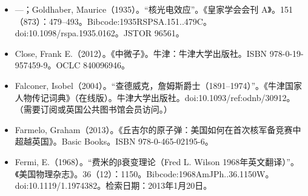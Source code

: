 \begin{itemize}
\item —；Goldhaber, Maurice（1935）。“核光电效应”。《皇家学会会刊 A》。151（873）：479–493。Bibcode:1935RSPSA.151..479C。doi:10.1098/rspa.1935.0162。JSTOR 96561。
\item Close, Frank E.（2012）。《中微子》。牛津：牛津大学出版社。ISBN 978-0-19-957459-9。OCLC 840096946。
\item Falconer, Isobel（2004）。“查德威克，詹姆斯爵士（1891–1974）”。《牛津国家人物传记词典》（在线版）。牛津大学出版社。doi:10.1093/ref:odnb/30912。（需要订阅或英国公共图书馆会员访问。）
\item Farmelo, Graham（2013）。《丘吉尔的原子弹：美国如何在首次核军备竞赛中超越英国》。Basic Books。ISBN 978-0-465-02195-6。
\item Fermi, E.（1968）。“费米的β衰变理论（Fred L. Wilson 1968年英文翻译）”。《美国物理杂志》。36（12）：1150。Bibcode:1968AmJPh..36.1150W。doi:10.1119/1.1974382。检索日期：2013年1月20日。


\end{itemize}
